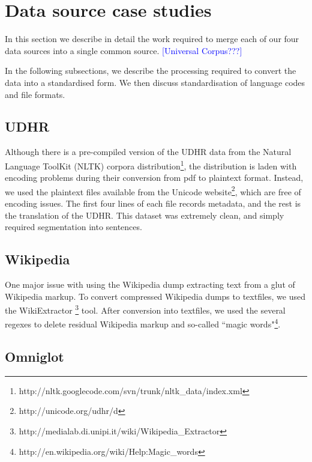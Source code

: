 \section{Data source case studies} \label{sec:case_studies}

In this section we describe in detail the work required to merge each of our four data sources into a single common source. \textcolor{blue}{[Universal Corpus???]}

In the following subsections, we describe the processing required to convert the data into a standardised form.  We then discuss standardisation of language codes and file formats.


\subsection{UDHR}

Although there is a pre-compiled version of the UDHR data from the Natural Language ToolKit (NLTK) corpora distribution\footnote{http://nltk.googlecode.com/svn/trunk/nltk\_data/index.xml}, the distribution is laden with encoding problems during their conversion from pdf to plaintext format. Instead, we used the plaintext files available from the Unicode website\footnote{http://unicode.org/udhr/d}, which are free of encoding issues. The first four lines of each file records metadata, and the rest is the translation of the UDHR. This dataset was extremely clean, and simply required segmentation into sentences.


\subsection{Wikipedia}

One major issue with using the Wikipedia dump extracting text from a glut of Wikipedia markup. To convert compressed Wikipedia dumps to textfiles, we used the WikiExtractor \footnote{http://medialab.di.unipi.it/wiki/Wikipedia\_Extractor} tool. After conversion into textfiles, we used the several regexes to delete residual Wikipedia markup and so-called ``magic words"\footnote{http://en.wikipedia.org/wiki/Help:Magic\_words}.


\subsection{Omniglot}


